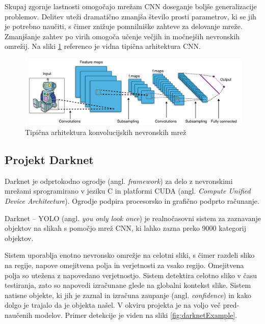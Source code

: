 \documentclass[runningheads,a4paper]{llncs}
\begin{document}
Skupaj zgornje lastnosti omogočajo mrežam CNN doseganje boljše generalizacije problemov. Delitev uteži dramatično zmanjša število prosti parametrov, ki se jih je potrebno naučiti, s čimer znižuje pomnilniške zahteve za delovanje mreže. Zmanjšanje zahtev po virih omogoča učenje večjih in močnejših nevronskih omrežij. Na sliki \ref{fig:archCNN} referenco je vidna tipična arhitektura CNN.

\begin{figure}[H]
\centering
\includegraphics[width=120mm]{figures/Typical_cnn.png}
\caption{Tipična arhitektura konvolucijskih nevronskih mrež}
\label{fig:archCNN}
\end{figure}

\subsection{Projekt Darknet}
Darknet je odprtokodno ogrodje (angl. \textit{framework}) za delo z nevronskimi mrežami sprogramirano v jeziku C in platformi CUDA (angl. \textit{Compute Unified Device Architecture})\cite{darknet13}. Ogrodje podpira procesorsko in grafično podprto računanje.

Darknet – YOLO (angl. \textit{you only look once}) je realnočasovni sistem za zaznavanje objektov na slikah s pomočjo mrež CNN, ki lahko zazna preko 9000 kategorij objektov. 

Sistem uporablja enotno nevronsko omrežje na celotni sliki, s čimer razdeli sliko na regije, napove omejitvena polja in verjetnosti za vsako regijo. Omejitvena polja so utežena z napovedano verjetnostjo. Sistem detektira celotno sliko v času testiranja, zato so napovedi izračunane glede na globalni kontekst slike. Sistem natisne objekte, ki jih je zaznal in izračuna zaupanje (angl. \textit{confidence}) in kako dolgo je trajalo da je objekta našel. V okviru projekta je na voljo več pred-naučenih modelov.  Primer detekcije je viden na sliki \ref{fig:darknetExample}.
\end{document}
